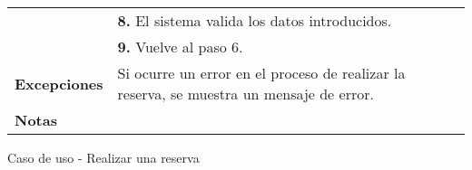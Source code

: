 \begin{analisisCasoDeUso}
\begin{tabular} { | m{3cm} | p{13cm} | }
		                            & {\bfseries 8.} El sistema valida los datos introducidos.                                               \\
		                            & {\bfseries 9.} Vuelve al paso 6.                                                                       \\ \hline
		{\bfseries Excepciones}     & Si ocurre un error en el proceso de realizar la reserva, se muestra un mensaje de error.               \\ \hline
		{\bfseries Notas }          &                                                                                                        \\ \hline
	\end{tabular}
	\caption{Caso de uso - Realizar una reserva}
\end{analisisCasoDeUso}